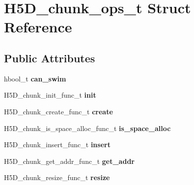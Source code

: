 \hypertarget{struct_h5_d__chunk__ops__t}{}\section{H5\+D\+\_\+chunk\+\_\+ops\+\_\+t Struct Reference}
\label{struct_h5_d__chunk__ops__t}
\subsection*{Public Attributes}
\begin{DoxyCompactItemize}
\item 
\mbox{\label{struct_h5_d__chunk__ops__t_afd4a5dfcda995625e5a2783674c6f1eb}} 
hbool\+\_\+t {\bfseries can\+\_\+swim}
\item 
\mbox{\label{struct_h5_d__chunk__ops__t_aaec3ec5eaa45ee9922bf7c26ad3d95c7}} 
H5\+D\+\_\+chunk\+\_\+init\+\_\+func\+\_\+t {\bfseries init}
\item 
\mbox{\label{struct_h5_d__chunk__ops__t_aa85689de90ac1b6c26ba94fd8bdd5bbf}} 
H5\+D\+\_\+chunk\+\_\+create\+\_\+func\+\_\+t {\bfseries create}
\item 
\mbox{\label{struct_h5_d__chunk__ops__t_ab65fb098cae88c42ef28bd1024d9e389}} 
H5\+D\+\_\+chunk\+\_\+is\+\_\+space\+\_\+alloc\+\_\+func\+\_\+t {\bfseries is\+\_\+space\+\_\+alloc}
\item 
\mbox{\label{struct_h5_d__chunk__ops__t_aedea65c692604830ba2bfd972f4abf32}} 
H5\+D\+\_\+chunk\+\_\+insert\+\_\+func\+\_\+t {\bfseries insert}
\item 
\mbox{\label{struct_h5_d__chunk__ops__t_a719a0c254623534983e15df0a7b56ec0}} 
H5\+D\+\_\+chunk\+\_\+get\+\_\+addr\+\_\+func\+\_\+t {\bfseries get\+\_\+addr}
\item 
\mbox{\label{struct_h5_d__chunk__ops__t_a85a214b258b691e4a7214499244bcc1b}} 
H5\+D\+\_\+chunk\+\_\+resize\+\_\+func\+\_\+t {\bfseries resize}
\item 
\mbox{\label{struct_h5_d__chunk__ops__t_aac86df7aec814855edd5bb78ffec8ee6}} 

\end{DoxyCompactItemize}
